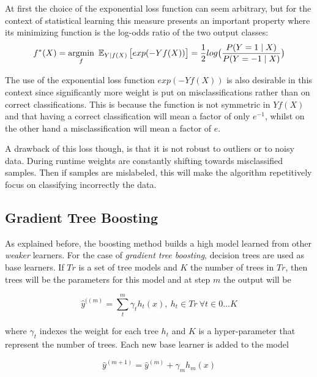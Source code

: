 At first the choice of the exponential loss function can seem arbitrary, but for the context of statistical learning this measure presents an important property where its minimizing function is the log-odds ratio of the two output classes:
\begin{equation}
f^*(X) = \underset{f}{\mathrm{argmin}} \  \operatorname{\mathbb{E}}_{Y | f(X)}\big[ exp(-Yf(X))  \big] = \frac{1}{2}
log\big( \frac{ P(Y=1 \mid X) }{ P(Y=-1 \mid X) }  \big)
\end{equation}


The use of the exponential loss function $exp(-Yf(X))$ is also desirable in this context since significantly more weight is put on misclassifications rather than on correct classifications. This is because the function is not symmetric in $Yf(X)$ and that having a correct classification will mean a factor of only $e^{-1}$, whilst on the other hand a misclassification will mean a factor of $e$.

A drawback of this loss though, is that it is not robust to outliers or to noisy data. During runtime weights are constantly shifting towards misclassified samples. Then if samples are mislabeled, this will make the algorithm repetitively focus on classifying incorrectly the data.



\subsection{Gradient Tree Boosting}

As explained before, the boosting method builds a high model learned from other \textit{weaker} learners. For the case of \textit{gradient tree boosting}, decision trees are used as base learners. If $Tr$ is a set of tree models and $K$ the number of trees in $Tr$, then trees will be the parameters for this model and at step $m$ the output will be

\begin{equation}
\hat{y}^{((m)}=  \sum_t^m \gamma_t h_t(x) , \  h_t \in Tr \ \forall t \in {0...K}
\end{equation}

where $\gamma_t$ indexes the weight for each tree $h_t$ and $K$ is a hyper-parameter that represent the number of trees. Each new base learner is added to the model

\begin{equation}
\hat{y}^{(m+1)} =   \hat{y}^{(m)}  + \gamma_m h_m(x)
\end{equation}

